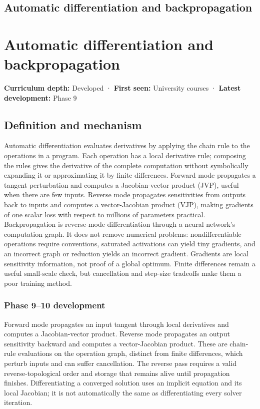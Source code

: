 \hypertarget{appendix-40df0855b4a7}{}
\section*{Automatic differentiation and backpropagation}
\chapter{Automatic differentiation and backpropagation}\label{appendix-40df0855b4a7-automatic-differentiation-and-backpropagation}

\textbf{Curriculum depth:} Developed · \textbf{First seen:} University courses · \textbf{Latest development:} Phase 9

\section{Definition and mechanism}\label{appendix-40df0855b4a7-definition-and-mechanism}

Automatic differentiation evaluates derivatives by applying the chain rule to the operations in a program. Each operation has a local derivative rule; composing the rules gives the derivative of the complete computation without symbolically expanding it or approximating it by finite differences. Forward mode propagates a tangent perturbation and computes a Jacobian-vector product (JVP), useful when there are few inputs. Reverse mode propagates sensitivities from outputs back to inputs and computes a vector-Jacobian product (VJP), making gradients of one scalar loss with respect to millions of parameters practical. Backpropagation is reverse-mode differentiation through a neural network's computation graph. It does not remove numerical problems: nondifferentiable operations require conventions, saturated activations can yield tiny gradients, and an incorrect graph or reduction yields an incorrect gradient. Gradients are local sensitivity information, not proof of a global optimum. Finite differences remain a useful small-scale check, but cancellation and step-size tradeoffs make them a poor training method.

\subsection{Phase 9--10 development}\label{appendix-40df0855b4a7-phase-910-development}

Forward mode propagates an input tangent through local derivatives and computes a Jacobian-vector product. Reverse mode propagates an output sensitivity backward and computes a vector-Jacobian product. These are chain-rule evaluations on the operation graph, distinct from finite differences, which perturb inputs and can suffer cancellation. The reverse pass requires a valid reverse-topological order and storage that remains alive until propagation finishes. Differentiating a converged solution uses an implicit equation and its local Jacobian; it is not automatically the same as differentiating every solver iteration.

